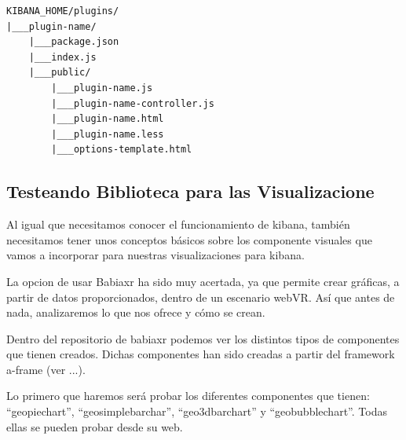 \documentclass[a4paper, 12pt]{book}
\begin{document}
\begin{lstlisting}[frame=single]
KIBANA_HOME/plugins/
|___plugin-name/
    |___package.json
    |___index.js
    |___public/
        |___plugin-name.js
        |___plugin-name-controller.js
        |___plugin-name.html
        |___plugin-name.less
        |___options-template.html

\end{lstlisting}



\subsection{Testeando Biblioteca para las Visualizacione}

Al igual que necesitamos conocer el funcionamiento de kibana, también necesitamos tener unos conceptos básicos sobre los componente visuales que vamos a incorporar para nuestras visualizaciones para kibana.

La opcion de usar Babiaxr ha sido muy acertada, ya que permite crear gráficas, a partir de datos proporcionados, dentro de un escenario webVR. Así que antes de nada, analizaremos lo que nos ofrece y cómo se crean.

Dentro del repositorio de babiaxr podemos ver los distintos tipos de componentes que tienen creados. Dichas componentes han sido creadas a partir del framework a-frame (ver ...).

Lo primero que haremos será probar los diferentes componentes que tienen: “geopiechart”, “geosimplebarchar”, “geo3dbarchart” y “geobubblechart”. Todas ellas se pueden probar desde su web.
\end{document}
